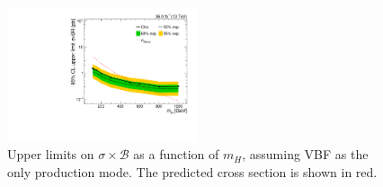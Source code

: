 \begin{figure}[]
    \begin{center}
        \includegraphics[width=0.5\textwidth]{figures/vbf/fits/mhscan.pdf}
        \caption{Upper limits on $\sigma\times \mathcal{B}$ as a function of $m_H$, assuming VBF as the only production mode.
                 The predicted cross section is shown in red.}
        \label{fig:vbf:mhscan}
    \end{center}
\end{figure}
